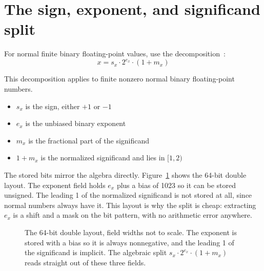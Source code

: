 \documentclass[manuscript, nonacm]{acmart}
\begin{document}


    \section{The sign, exponent, and significand split}

    For normal finite binary floating-point values, use the decomposition~\cite{ieee,handbook}:
    \[ x = s_x \cdot 2^{e_x} \cdot (1 + m_x) \]

    This decomposition applies to finite nonzero normal binary floating-point
    numbers.

    \begin{itemize}
        \item $s_x$ is the sign, either $+1$ or $-1$
        \item $e_x$ is the unbiased binary exponent
        \item $m_x$ is the fractional part of the significand
        \item $1 + m_x$ is the normalized significand and lies in $[1, 2)$
    \end{itemize}

    The stored bits mirror the algebra directly. Figure~\ref{fig:doublebits}
    shows the 64-bit double layout. The exponent field holds $e_x$ plus a
    bias of 1023 so it can be stored unsigned. The leading 1 of the
    normalized significand is not stored at all, since normal numbers always
    have it. This layout is why the split is cheap: extracting $e_x$ is a
    shift and a mask on the bit pattern, with no arithmetic error anywhere.

    \begin{figure}[tbp]
        \centering
        \caption{The 64-bit double layout, field widths not to scale. The
        exponent is stored with a bias so it is always nonnegative, and the
        leading 1 of the significand is implicit. The algebraic split
            $s_x \cdot 2^{e_x} \cdot (1 + m_x)$ reads straight out of these three
            fields.}
        \label{fig:doublebits}
    \end{figure}
\end{document}
